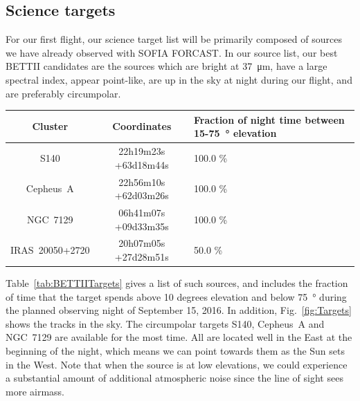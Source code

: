 \subsection{Science targets}
For our first flight, our science target list will be primarily composed of sources we have already observed with SOFIA FORCAST. In our source list, our best BETTII candidates are the sources which are bright at \SI{37}{\um}, have a large spectral index, appear point-like, are up in the sky at night during our flight, and are preferably circumpolar. 

\begin{table}[ht!]
\begin{center}
\caption{BETTII Targets}
\label{tab:BETTIITargets}
\vspace{-0.5cm}
\begin{longtable}{ccP{4cm}}
\toprule										
	Cluster	&	Coordinates	&	Fraction of night time between 15-\SI{75}{\degree} elevation		\\	
\midrule										
	S140	&	 22h19m23s +63d18m44s 	&	100.0	\%	\\		
	Cepheus~A	&	 22h56m10s +62d03m26s 	&	100.0	\%	\\	
	NGC~7129	&	 06h41m07s +09d33m35s 	&	100.0	\%	\\
	IRAS~20050+2720	&	 20h07m05s +27d28m51s 	&	50.0	\%	\\
\bottomrule										
\end{longtable}
\end{center}
\end{table}			

Table~\ref{tab:BETTIITargets} gives a list of such sources, and includes the fraction of time that the target spends above 10 degrees elevation and below \SI{75}{\degree} during the planned observing night of September 15, 2016. In addition, Fig.~\ref{fig:Targets} shows the tracks in the sky. The circumpolar targets S140, Cepheus~A and NGC~7129 are available for the most time. All are located well in the East at the beginning of the night, which means we can point towards them as the Sun sets in the West. Note that when the source is at low elevations, we could experience a substantial amount of additional atmospheric noise since the line of sight sees more airmass.

